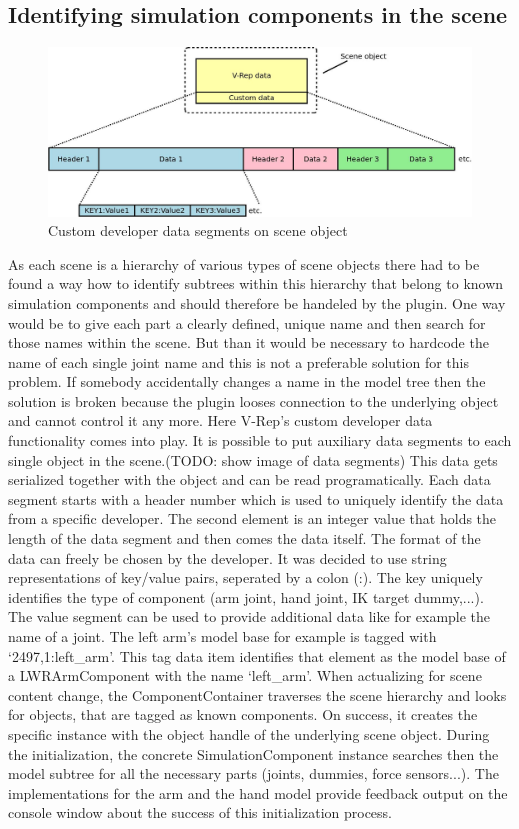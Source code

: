 \subsection{Identifying simulation components in the scene}
\begin{figure}[ht]
	\centering
  	\includegraphics[width=1.0\textwidth]{images/custom_dev_data.jpg}
	\caption{Custom developer data segments on scene object}
	\label{fig:cust_dev_data}
\end{figure}
As each scene is a hierarchy of various types of scene objects there had to be found a way how to identify subtrees within this hierarchy that belong to known simulation components and should therefore be handeled by the plugin. One way would be to give each part a clearly defined, unique name and then search for those names within the scene. But than it would be necessary to hardcode the name of each single joint name and this is not a preferable solution for this problem. If somebody accidentally changes a name in the model tree then the solution is broken because the plugin looses connection to the underlying object and cannot control it any more. Here V-Rep's custom developer data functionality comes into play. It is possible to put auxiliary data segments to each single object in the scene.(TODO: show image of data segments) This data gets serialized together with the object and can be read programatically. Each data segment starts with a header number which is used to uniquely identify the data from a specific developer. The second element is an integer value that holds the length of the data segment and then comes the data itself. The format of the data can freely be chosen by the developer. It was decided to use string representations of key/value pairs, seperated by a colon (:). The key uniquely identifies the type of component (arm joint, hand joint, IK target dummy,...). The value segment can be used to provide additional data like for example the name of a joint. The left arm's model base for example is tagged with `2497,1:left\_arm'. This tag data item identifies that element as the model base of a LWRArmComponent with the name `left\_arm'. When actualizing for scene content change, the ComponentContainer traverses the scene hierarchy and looks for objects, that are tagged as known components. On success, it creates the specific instance with the object handle of the underlying scene object. During the initialization, the concrete SimulationComponent instance searches then the model subtree for all the necessary parts (joints, dummies, force sensors...). The implementations for the arm and the hand model provide feedback output on the console window about the success of this initialization process.


